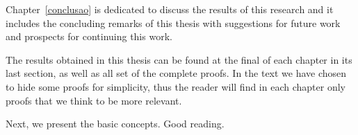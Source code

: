 Chapter~\ref{conclusao} is dedicated to discuss the results of this research and it includes the concluding remarks of this thesis with suggestions for future work and prospects for continuing this work.


The results obtained in this thesis can be found at the final of each
chapter in its last section, as well as all set of the complete proofs. In the
text we have chosen to hide some proofs for simplicity, thus the reader will find in each chapter only  proofs that we think to be more relevant. %

Next, we present the basic concepts. Good reading.
